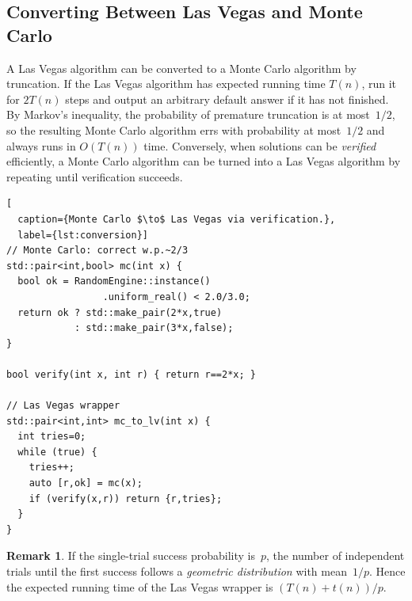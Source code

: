 \documentclass[twoside,12pt]{book}
\theoremstyle{plain}
\theoremstyle{definition}
\newtheorem{remark}[theorem]{Remark}
\theoremstyle{remark}
\begin{document}
\subsection{Converting Between Las Vegas and Monte Carlo}

A Las Vegas algorithm can be converted to a Monte Carlo algorithm by
truncation.  If the Las Vegas algorithm has expected running time
$T(n)$, run it for $2T(n)$ steps and output an arbitrary default
answer if it has not finished.  By Markov's inequality, the
probability of premature truncation is at most~$1/2$, so the resulting
Monte Carlo algorithm errs with probability at most~$1/2$ and always
runs in $O(T(n))$ time.  Conversely, when solutions can be
\emph{verified} efficiently, a Monte Carlo algorithm can be turned
into a Las Vegas algorithm by repeating until verification succeeds.

\begin{lstlisting}[
  caption={Monte Carlo $\to$ Las Vegas via verification.},
  label={lst:conversion}]
// Monte Carlo: correct w.p.~2/3
std::pair<int,bool> mc(int x) {
  bool ok = RandomEngine::instance()
                 .uniform_real() < 2.0/3.0;
  return ok ? std::make_pair(2*x,true)
            : std::make_pair(3*x,false);
}

bool verify(int x, int r) { return r==2*x; }

// Las Vegas wrapper
std::pair<int,int> mc_to_lv(int x) {
  int tries=0;
  while (true) {
    tries++;
    auto [r,ok] = mc(x);
    if (verify(x,r)) return {r,tries};
  }
}
\end{lstlisting}

\begin{remark}
If the single-trial success probability is~$p$, the number of independent
trials until the first success follows a \emph{geometric distribution} with
mean~$1/p$.  Hence the expected running time of the Las Vegas wrapper is
$(T(n)+t(n))/p$.
\end{remark}

\end{document}
